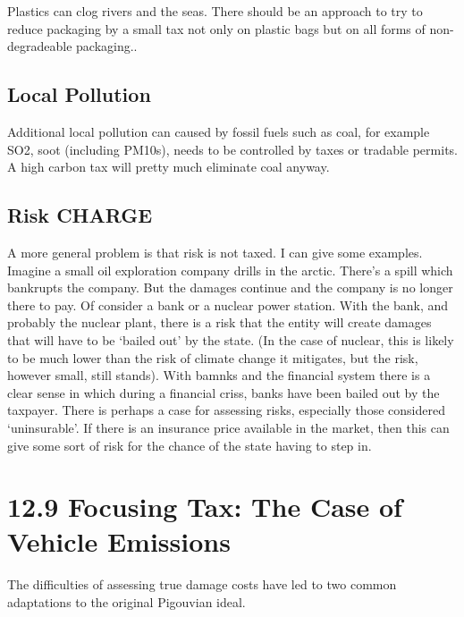 \documentclass[]{tufte-handout}
\begin{document}
Plastics can clog rivers and the seas. There should be an approach to
try to reduce packaging by a small tax not only on plastic bags but on
all forms of non-degradeable packaging..

\hypertarget{local-pollution}{%
\subsection{Local Pollution}\label{local-pollution}}

Additional local pollution can caused by fossil fuels such as coal, for
example SO2, soot (including PM10s), needs to be controlled by taxes or
tradable permits. A high carbon tax will pretty much eliminate coal
anyway.

\hypertarget{risk-charge}{%
\subsection{Risk CHARGE}\label{risk-charge}}

A more general problem is that risk is not taxed. I can give some
examples. Imagine a small oil exploration company drills in the arctic.
There's a spill which bankrupts the company. But the damages continue
and the company is no longer there to pay. Of consider a bank or a
nuclear power station. With the bank, and probably the nuclear plant,
there is a risk that the entity will create damages that will have to be
`bailed out' by the state. (In the case of nuclear, this is likely to be
much lower than the risk of climate change it mitigates, but the risk,
however small, still stands). With bamnks and the financial system there
is a clear sense in which during a financial criss, banks have been
bailed out by the taxpayer. There is perhaps a case for assessing risks,
especially those considered `uninsurable'. If there is an insurance
price available in the market, then this can give some sort of risk for
the chance of the state having to step in.

\hypertarget{focusing-tax-the-case-of-vehicle-emissions}{%
\section{12.9 Focusing Tax: The Case of Vehicle
Emissions}\label{focusing-tax-the-case-of-vehicle-emissions}}

The difficulties of assessing true damage costs have led to two common
adaptations to the original Pigouvian ideal.
\end{document}
